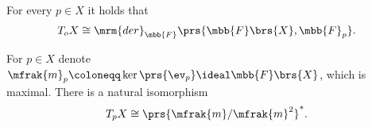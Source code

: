 \documentclass[10pt,a4paper,twoside,openany,hidelinks]{book}
\begin{document}
\begin{corollary}
For every $p \in X$ it holds that
\begin{align*}
T_o X \cong \mrm{der}_{\mbb{F}}\prs{\mbb{F}\brs{X}, \mbb{F}_p} \text{.}
\end{align*}
\end{corollary}

\begin{proposition}
For $p \in X$ denote $\mfrak{m}_p \coloneqq \ker\prs{\ev_p} \ideal \mbb{F}\brs{X}$, which is maximal.
There is a natural isomorphism
\[T_p X \cong \prs{\mfrak{m}/\mfrak{m}^2}^* \text{.}\]
\end{proposition}

\backmatter
\end{document}
